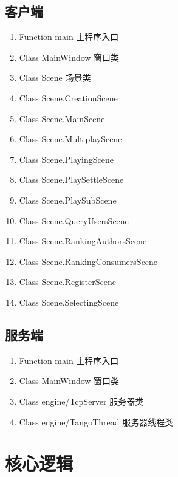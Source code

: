 \documentclass[UTF8]{ctexart}
\begin{document}
\subsection{客户端}
\begin{enumerate}[1]
    \item \textcolor{func}{Function} main 主程序入口
    \item \textcolor{cls}{Class} MainWindow 窗口类
    \item \textcolor{cls}{Class} Scene 场景类
    \item \textcolor{cls}{Class} Scene.CreationScene
    \item \textcolor{cls}{Class} Scene.MainScene
    \item \textcolor{cls}{Class} Scene.MultiplayScene
    \item \textcolor{cls}{Class} Scene.PlayingScene
    \item \textcolor{cls}{Class} Scene.PlaySettleScene
    \item \textcolor{cls}{Class} Scene.PlaySubScene
    \item \textcolor{cls}{Class} Scene.QueryUsersScene
    \item \textcolor{cls}{Class} Scene.RankingAuthorsScene
    \item \textcolor{cls}{Class} Scene.RankingConsumersScene
    \item \textcolor{cls}{Class} Scene.RegisterScene
    \item \textcolor{cls}{Class} Scene.SelectingScene
\end{enumerate}
\subsection{服务端}
\begin{enumerate}[1]
    \item \textcolor{func}{Function} main 主程序入口
    \item \textcolor{cls}{Class} MainWindow 窗口类
    \item \textcolor{cls}{Class} engine/TcpServer 服务器类
    \item \textcolor{cls}{Class} engine/TangoThread 服务器线程类
\end{enumerate}
\section{核心逻辑}
\end{document}
